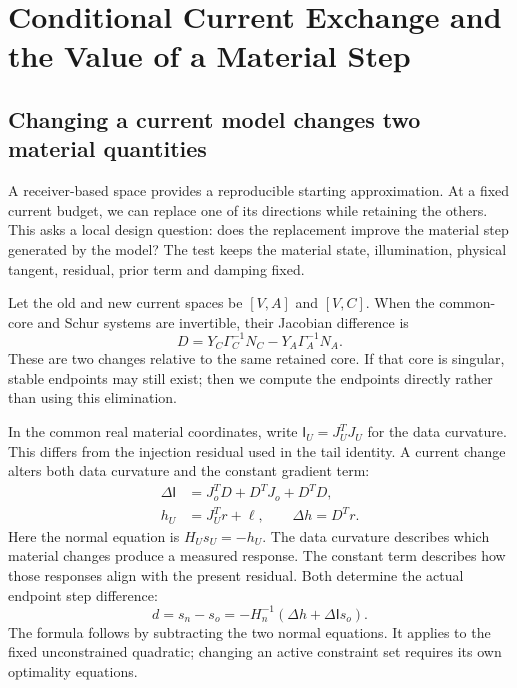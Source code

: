 \section{Conditional Current Exchange and the Value of a Material Step}
\subsection{Changing a current model changes two material quantities}
A receiver-based space provides a reproducible starting approximation. At a fixed current budget, we can replace one of its directions while retaining the others. This asks a local design question: does the replacement improve the material step generated by the model? The test keeps the material state, illumination, physical tangent, residual, prior term and damping fixed.

Let the old and new current spaces be $[V,A]$ and $[V,C]$. When the common-core and Schur systems are invertible, their Jacobian difference is
\begin{equation}\label{eq:exchange-difference}
 D=Y_C\Gamma_C^{-1}N_C-Y_A\Gamma_A^{-1}N_A.
\end{equation}
These are two changes relative to the same retained core. If that core is singular, stable endpoints may still exist; then we compute the endpoints directly rather than using this elimination.

In the common real material coordinates, write $\mathsf I_U=J_U^TJ_U$ for the data curvature. This differs from the injection residual used in the tail identity. A current change alters both data curvature and the constant gradient term:
\begin{equation}\label{eq:information-offset}
\begin{aligned}
 \Delta\mathsf I&=J_o^TD+D^TJ_o+D^TD,\\
 h_U&=J_U^Tr+\ell,\qquad \Delta h=D^Tr.
\end{aligned}
\end{equation}
Here the normal equation is $H_Us_U=-h_U$. The data curvature describes which material changes produce a measured response. The constant term describes how those responses align with the present residual. Both determine the actual endpoint step difference:
\begin{equation}\label{eq:exchange-step}
 d=s_n-s_o=-H_n^{-1}(\Delta h+\Delta\mathsf I s_o).
\end{equation}
The formula follows by subtracting the two normal equations. It applies to the fixed unconstrained quadratic; changing an active constraint set requires its own optimality equations.

